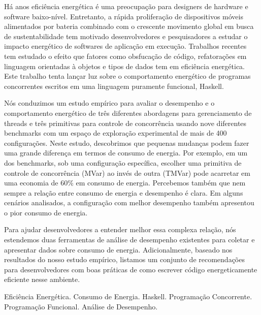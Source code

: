 Há anos eficiência energética é uma preocupação para designers de hardware e software baixo-nível. Entretanto, a rápida proliferação de dispositivos móveis alimentados por bateria combinado com o crescente movimento global em busca de sustentabilidade tem motivado desenvolvedores e pesquisadores a estudar o impacto energético de softwares de aplicação em execução. Trabalhos recentes tem estudado o efeito que fatores como obsfucação de código, refatorações em linguagem orientadas à objetos e tipos de dados tem em eficiência energética. Este trabalho tenta lançar luz sobre o comportamento energético de programas concorrentes escritos em uma linguagem puramente funcional, Haskell.

Nós conduzimos um estudo empírico para avaliar o desempenho e o comportamento energético de três diferentes abordagens para gerenciamento de threads e três primitivas para controle de concorrência usando nove diferentes benchmarks com um espaço de exploração experimental de mais de 400 configurações. Neste estudo, descobrimos que pequenas mudanças podem fazer uma grande diferença em termos de consumo de energia. Por exemplo, em um dos benchmarks, sob uma configuração específica, escolher uma primitiva de controle de concorrência (MVar) ao invés de outra (TMVar) pode acarretar em uma economia de 60\% em consumo de energia. Percebemos também que nem sempre a relação entre consumo de energia e desempenho é clara. Em alguns cenários analisados, a configuração com melhor desempenho também apresentou o pior consumo de energia.

Para ajudar desenvolvedores a entender melhor essa complexa relação, nós estendemos duas ferramentas de análise de desempenho existentes para coletar e apresentar dados sobre consumo de energia. Adicionalmente, baseado nos resultados do nosso estudo empírico, listamos um conjunto de recomendações para desenvolvedores com boas práticas de como escrever código energeticamente eficiente nesse ambiente.

\begin{keywords}
Eficiência Energética. Consumo de Energia. Haskell. Programação Concorrente. Programação Funcional. Análise de Desempenho.
\end{keywords}
